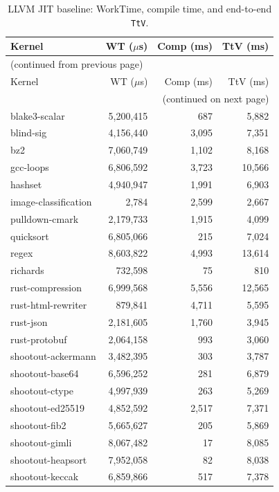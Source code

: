 \begin{longtable}{l r r r}
\caption{LLVM JIT baseline: WorkTime, compile time, and end-to-end \texttt{TtV}.}
\label{tbl:appB:llvm}\\
\toprule
Kernel & WT ($\mu$s) & Comp (ms) & TtV (ms) \\
\midrule
\endfirsthead
\multicolumn{4}{l}{\small (continued from previous page)} \\
\toprule
Kernel & WT ($\mu$s) & Comp (ms) & TtV (ms) \\
\midrule
\endhead
\midrule
\multicolumn{4}{r}{\small (continued on next page)} \\
\endfoot
\bottomrule
\endlastfoot
blake3-scalar & 5{,}200{,}415 & 687 & 5{,}882 \\
blind-sig & 4{,}156{,}440 & 3{,}095 & 7{,}351 \\
bz2 & 7{,}060{,}749 & 1{,}102 & 8{,}168 \\
gcc-loops & 6{,}806{,}592 & 3{,}723 & 10{,}566 \\
hashset & 4{,}940{,}947 & 1{,}991 & 6{,}903 \\
image-classification & 2{,}784 & 2{,}599 & 2{,}667 \\
pulldown-cmark & 2{,}179{,}733 & 1{,}915 & 4{,}099 \\
quicksort & 6{,}805{,}066 & 215 & 7{,}024 \\
regex & 8{,}603{,}822 & 4{,}993 & 13{,}614 \\
richards & 732{,}598 & 75 & 810 \\
rust-compression & 6{,}999{,}568 & 5{,}556 & 12{,}565 \\
rust-html-rewriter & 879{,}841 & 4{,}711 & 5{,}595 \\
rust-json & 2{,}181{,}605 & 1{,}760 & 3{,}945 \\
rust-protobuf & 2{,}064{,}158 & 993 & 3{,}060 \\
shootout-ackermann & 3{,}482{,}395 & 303 & 3{,}787 \\
shootout-base64 & 6{,}596{,}252 & 281 & 6{,}879 \\
shootout-ctype & 4{,}997{,}939 & 263 & 5{,}269 \\
shootout-ed25519 & 4{,}852{,}592 & 2{,}517 & 7{,}371 \\
shootout-fib2 & 5{,}665{,}627 & 205 & 5{,}869 \\
shootout-gimli & 8{,}067{,}482 & 17 & 8{,}085 \\
shootout-heapsort & 7{,}952{,}058 & 82 & 8{,}038 \\
shootout-keccak & 6{,}859{,}866 & 517 & 7{,}378 \\

\end{longtable}
